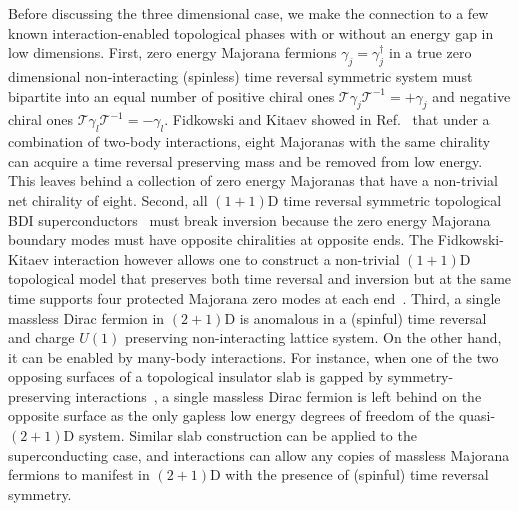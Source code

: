 Before discussing the three dimensional case, we make the connection to a few known interaction-enabled topological phases with or without an energy gap in low dimensions. First, zero energy Majorana fermions $\gamma_j=\gamma_j^\dagger$ in a true zero dimensional non-interacting (spinless) time reversal symmetric system must bipartite into an equal number of positive chiral ones $\mathcal{T}\gamma_j\mathcal{T}^{-1}=+\gamma_j$ and negative chiral ones $\mathcal{T}\gamma_l\mathcal{T}^{-1}=-\gamma_l$. Fidkowski and Kitaev showed in Ref.~ that under a combination of two-body interactions, eight Majoranas with the same chirality can acquire a time reversal preserving mass and be removed from low energy. This leaves behind a collection of zero energy Majoranas that have a non-trivial net chirality of eight. Second, all $(1+1)$D time reversal symmetric topological BDI superconductors~\cite{SchnyderRyuFurusakiLudwig08,Kitaevtable08,QiHughesRaghuZhang09,HasanKane10,QiZhangreview11,RMP} must break inversion because the zero energy Majorana boundary modes must have opposite chiralities at opposite ends. The Fidkowski-Kitaev interaction however allows one to construct a non-trivial $(1+1)$D topological model that preserves both time reversal and inversion but at the same time supports four protected Majorana zero modes at each end~\cite{LapaTeoHughes14}. Third, a single massless Dirac fermion in $(2+1)$D is anomalous in a (spinful) time reversal and charge $U(1)$ preserving non-interacting lattice system. On the other hand, it can be enabled by many-body interactions. For instance, when one of the two opposing surfaces of a topological insulator slab is gapped by symmetry-preserving interactions~\cite{WangPotterSenthilgapTI13,MetlitskiKaneFisher13b,ChenFidkowskiVishwanath14,BondersonNayakQi13}, a single massless Dirac fermion is left behind on the opposite surface as the only gapless low energy degrees of freedom of the quasi-$(2+1)$D system. Similar slab construction can be applied to the superconducting case, and interactions can allow any copies of massless Majorana fermions to manifest in $(2+1)$D with the presence of (spinful) time reversal symmetry.

